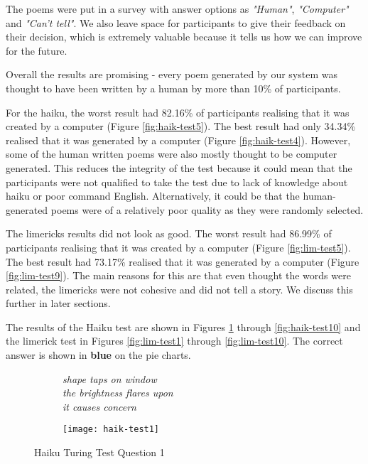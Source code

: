 The poems were put in a survey with answer options as \textit{"Human"}, \textit{"Computer"} and \textit{"Can't tell"}. We also leave space for participants to give their feedback on their decision, which is extremely valuable because it  tells us how we can improve for the future.

Overall the results are promising - every poem generated by our system was thought to have been written by a human by more than 10\% of participants. 

For the haiku, the worst result had 82.16\% of participants realising that it was created by a computer (Figure \ref{fig:haik-test5}). The best result had only 34.34\% realised that it was generated by a computer (Figure \ref{fig:haik-test4}). However, some of the human written poems were also mostly thought to be computer generated. This reduces the integrity of the test because it could mean that the participants were not qualified to take the test due to lack of knowledge about haiku or poor command English. Alternatively, it could be that the human-generated poems were of a relatively poor quality as they were randomly selected.

The limericks results did not look as good. The worst result had 86.99\% of participants realising that it was created by a computer (Figure \ref{fig:lim-test5}). The best result had 73.17\% realised that it was generated by a computer (Figure \ref{fig:lim-test9}). The main reasons for this are that even thought the words were related, the limericks were not cohesive and did not tell a story. We discuss this further in later sections.

The results of the Haiku test are shown in Figures \ref{fig:haik-test1} through \ref{fig:haik-test10} and the limerick test in Figures \ref{fig:lim-test1} through \ref{fig:lim-test10}. The correct answer is shown in \textbf{blue} on the pie charts.

\begin{figure}[H]
\centering
\begin{subfigure}[t!]{0.45\textwidth}
	\centering
    \textit{shape taps on window\\the brightness flares upon\\it causes concern}
\end{subfigure}
\begin{subfigure}[t!]{0.45\textwidth}
	\centering
    \texttt{[image: haik-test1]}
\end{subfigure}
\caption{Haiku Turing Test Question 1}
\label{fig:haik-test1}
\end{figure}

